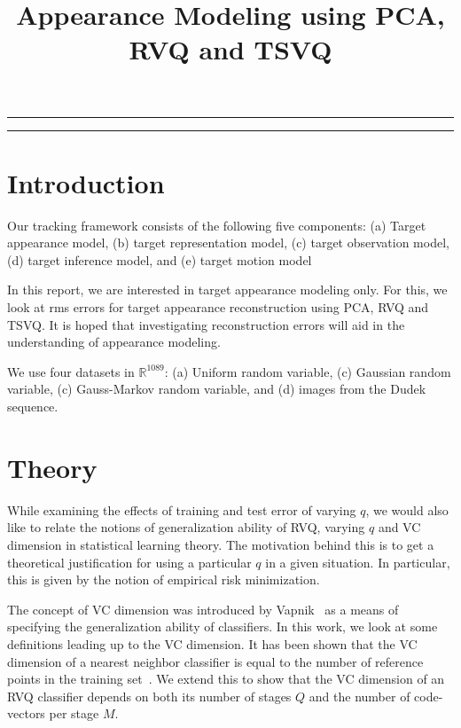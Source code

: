 
\title{Appearance Modeling using PCA, RVQ and TSVQ}
\date{}

\maketitle
\rule[0pt]{\textwidth}{1pt}
\tableofcontents
\rule[0pt]{\textwidth}{1pt}

\section{Introduction}
Our tracking framework consists of the following five components: (a) Target appearance model, (b) target representation model, (c) target observation model, (d) target inference model, and (e) target motion model

In this report, we are interested in target appearance modeling only.  For this, we look at rms errors for target appearance reconstruction using PCA, RVQ and TSVQ.  It is hoped that investigating reconstruction errors will aid in the understanding of appearance modeling.

We use four datasets in $\mathbb{R}^{1089}$: (a) Uniform random variable, (c) Gaussian random variable, (c) Gauss-Markov random variable, and (d) images from the Dudek sequence.

\section{Theory}
While examining the effects of training and test error of varying $q$, we would also like to relate the notions of generalization ability of RVQ, varying $q$ and VC dimension in statistical learning theory.  The  motivation behind this is to get a theoretical justification for using a particular $q$ in a given situation.  In particular, this is given by the notion of empirical risk minimization.

The concept of VC dimension was introduced by Vapnik~\cite{1999_BOOK_PRML_Vapnik} as a means of specifying the generalization ability of classifiers.  In this work, we look at some definitions leading up to the VC dimension.  It has been shown that the VC dimension of a nearest neighbor classifier is equal to the number of reference points in the training set~\cite{2003_JNL_PRML_Karacali}.  We extend this to show that the VC dimension of an RVQ classifier depends on both its number of stages $Q$ and the number of code-vectors per stage $M$.

